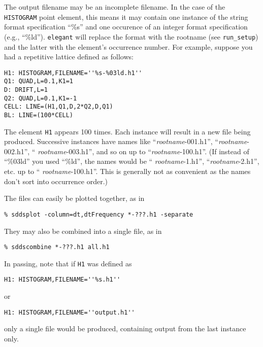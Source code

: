 The output filename may be an incomplete filename.  In the case of the
\verb|HISTOGRAM| point element, this means it may contain one instance of
the string format specification ``\%s'' and one occurence of an
integer format specification (e.g., ``\%ld'').  {\tt elegant} will
replace the format with the rootname (see
\verb|run_setup|) and the latter with the element's occurrence
number.  For example, suppose you had a repetitive lattice defined as
follows:
\begin{verbatim}
H1: HISTOGRAM,FILENAME=''%s-%03ld.h1''
Q1: QUAD,L=0.1,K1=1
D: DRIFT,L=1
Q2: QUAD,L=0.1,K1=-1
CELL: LINE=(H1,Q1,D,2*Q2,D,Q1)
BL: LINE=(100*CELL)
\end{verbatim}
The element \verb|H1| appears 100 times.  Each instance will result in
a new file being produced.  Successive instances have names like
``{\em rootname}-001.h1'', ``{\em rootname}-002.h1'', ``{\em
rootname}-003.h1'', and so on up to ``{\em rootname}-100.h1''.  (If
instead of ``\%03ld'' you used ``\%ld'', the names would be ``{\em
rootname}-1.h1'', ``{\em rootname}-2.h1'', etc. up to ``{\em
rootname}-100.h1''.  This is generally not as convenient as the names
don't sort into occurrence order.)

The files can easily be plotted together, as in 
\begin{verbatim}
% sddsplot -column=dt,dtFrequency *-???.h1 -separate 
\end{verbatim}
They may also be combined into a single file, as in
\begin{verbatim}
% sddscombine *-???.h1 all.h1 
\end{verbatim}

In passing, note that if \verb|H1| was defined as
\begin{verbatim}
H1: HISTOGRAM,FILENAME=''%s.h1''
\end{verbatim}
or 
\begin{verbatim}
H1: HISTOGRAM,FILENAME=''output.h1''
\end{verbatim}
only a single file would be produced, containing output from the last instance
only.

